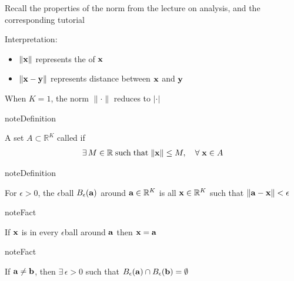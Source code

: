 \documentclass[letterpaper,10pt,english]{jupyterBook}
\begin{document}
\sphinxAtStartPar
Recall the properties of the norm from the lecture on analysis, and the corresponding tutorial

\sphinxAtStartPar
Interpretation:
\begin{itemize}
\item {} 
\sphinxAtStartPar
\(\| {\bf x} \|\) represents the  of \({\bf x}\)

\item {} 
\sphinxAtStartPar
\(\| {\bf x} - {\bf y} \|\) represents distance between \({\bf x}\) and \({\bf y}\)

\end{itemize}

\sphinxAtStartPar
When \(K=1\), the norm \(\| \cdot \|\) reduces to \(|\cdot|\)

\begin{sphinxadmonition}{note}{Definition}

\sphinxAtStartPar
A set \(A \subset \mathbb{R}^K\) called  if
\begin{equation*}
\begin{split}
%
\exists \, M \in \mathbb{R} 
\; \mathrm{such\;that} \;
\|{\bf x}\| \leq M, \quad \forall \; {\bf x} \in A
%
\end{split}
\end{equation*}\end{sphinxadmonition}

\begin{sphinxadmonition}{note}{Definition}

\sphinxAtStartPar
For \(\epsilon > 0\), the \(\epsilon\)\sphinxhyphen{}ball \(B_{\epsilon}({\bf a})\) around
\({\bf a} \in \mathbb{R}^K\) is all \({\bf x} \in \mathbb{R}^K\) such that \(\|{\bf a} - {\bf x}\|
< \epsilon\)
\end{sphinxadmonition}

\begin{figure}[htbp]
\centering

\noindent{}
\end{figure}

\begin{sphinxadmonition}{note}{Fact}

\sphinxAtStartPar
If \({\bf x}\) is in every \(\epsilon\)\sphinxhyphen{}ball around \({\bf a}\) then
\({\bf x}={\bf a}\)
\end{sphinxadmonition}

\begin{sphinxadmonition}{note}{Fact}

\sphinxAtStartPar
If \({\bf a} \ne {\bf b}\), then \(\exists \, \epsilon > 0\) such that
\(B_\epsilon({\bf a}) \cap B_\epsilon({\bf b}) = \emptyset\)
\end{sphinxadmonition}
\end{document}
